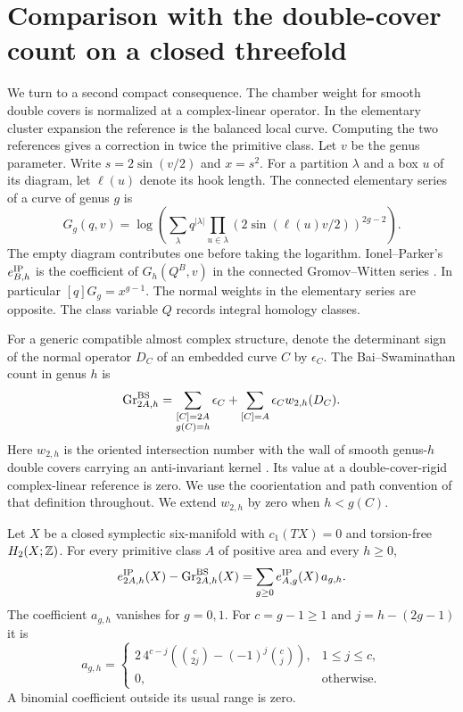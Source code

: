 \section{Comparison with the double-cover count on a closed threefold}\label{sec:normalization}
We turn to a second compact consequence. The chamber weight for smooth double covers is normalized at a complex-linear operator. In the elementary cluster expansion the reference is the balanced local curve. Computing the two references gives a correction in twice the primitive class.
Let $v$ be the genus parameter. Write $s=2\sin(v/2)$ and $x=s^2$. For a partition $\lambda$ and a box
$u$ of its diagram, let $\ell(u)$ denote its hook length. The connected
elementary series of a curve of genus $g$ is
\[
 G_g(q,v)=\log\!\left(\sum_{\lambda}q^{|\lambda|}
            \prod_{u\in\lambda}(2\sin(\ell(u)v/2))^{2g-2}\right).
\]
The empty diagram contributes one before taking the logarithm.
Ionel--Parker's $e^{\rm IP}_{B,h}$ is the coefficient of
$G_h(Q^B,v)$ in the connected Gromov--Witten series
\cite[Proposition~3.3 and (8.1)]{ip}. In particular
$[q]G_g=x^{g-1}$. The normal weights in the elementary series are
opposite. The class variable $Q$ records integral homology classes.

For a generic compatible almost complex structure, denote the
determinant sign of the normal operator $D_C$ of an embedded curve $C$
by $\epsilon_C$. The Bai--Swaminathan count in genus $h$ is
\[
 \operatorname{Gr}^{\rm BS}_{2A,h}
 =\sum_{\substack{[C]=2A\\g(C)=h}}\epsilon_C
       +\sum_{[C]=A}\epsilon_C w_{2,h}(D_C).
\]
Here $w_{2,h}$ is the oriented intersection number with the wall of
smooth genus-$h$ double covers carrying an anti-invariant kernel
\cite[(1.5), Definitions~5.8 and~5.17]{bai}. Its value at a
double-cover-rigid complex-linear reference is zero. We use the
coorientation and path convention of that definition throughout.
We extend $w_{2,h}$ by zero when $h<g(C)$.

\begin{theorem}\label{p9-thm:global}
Let $X$ be a closed symplectic six-manifold with $c_1(TX)=0$ and torsion-free $H_2(X;\mathbb Z)$. For every primitive class $A$ of
positive area and every $h\ge0$,
\begin{equation}\label{p9-eq:global}
 e^{\rm IP}_{2A,h}(X)-\operatorname{Gr}^{\rm BS}_{2A,h}(X)
       =\sum_{g\ge0} e^{\rm IP}_{A,g}(X)\,a_{g,h}.
\end{equation}
The coefficient $a_{g,h}$ vanishes for $g=0,1$. For $c=g-1\ge1$ and
$j=h-(2g-1)$ it is
\begin{equation}\label{p9-eq:coeff}
 a_{g,h}=
 \begin{cases}
  2\,4^{c-j}\left(\binom{c}{2j}-(-1)^j\binom{c}{j}\right),&1\le j\le c,\\[2pt]
  0,&\text{otherwise}.
 \end{cases}
\end{equation}
A binomial coefficient outside its usual range is zero.
\end{theorem}

